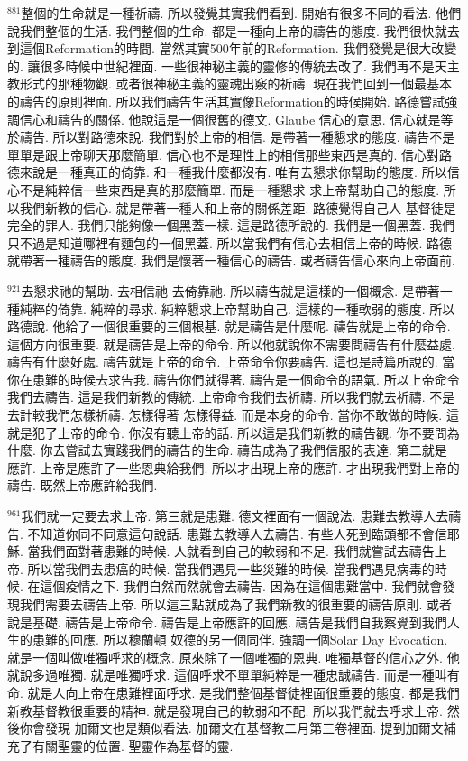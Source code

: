 \documentclass{book}
\begin{document}
$^{881}$整個的生命就是一種祈禱.
所以發覺其實我們看到.
開始有很多不同的看法.
他們說我們整個的生活.
我們整個的生命.
都是一種向上帝的禱告的態度.
我們很快就去到這個Reformation的時間.
當然其實500年前的Reformation.
我們發覺是很大改變的.
讓很多時候中世紀裡面.
一些很神秘主義的靈修的傳統去改了.
我們再不是天主教形式的那種物觀.
或者很神秘主義的靈魂出竅的祈禱.
現在我們回到一個最基本的禱告的原則裡面.
所以我們禱告生活其實像Reformation的時候開始.
路德嘗試強調信心和禱告的關係.
他說這是一個很舊的德文.
Glaube 信心的意思.
信心就是等於禱告.
所以對路德來說.
我們對於上帝的相信.
是帶著一種懇求的態度.
禱告不是單單是跟上帝聊天那麼簡單.
信心也不是理性上的相信那些東西是真的.
信心對路德來說是一種真正的倚靠.
和一種我什麼都沒有.
唯有去懇求你幫助的態度.
所以信心不是純粹信一些東西是真的那麼簡單.
而是一種懇求 求上帝幫助自己的態度.
所以我們新教的信心.
就是帶著一種人和上帝的關係差距.
路德覺得自己人 基督徒是完全的罪人.
我們只能夠像一個黑蓋一樣.
這是路德所說的.
我們是一個黑蓋.
我們只不過是知道哪裡有麵包的一個黑蓋.
所以當我們有信心去相信上帝的時候.
路德就帶著一種禱告的態度.
我們是懷著一種信心的禱告.
或者禱告信心來向上帝面前.

$^{921}$去懇求祂的幫助.
去相信祂 去倚靠祂.
所以禱告就是這樣的一個概念.
是帶著一種純粹的倚靠.
純粹的尋求.
純粹懇求上帝幫助自己.
這樣的一種軟弱的態度.
所以路德說.
他給了一個很重要的三個根基.
就是禱告是什麼呢.
禱告就是上帝的命令.
這個方向很重要.
就是禱告是上帝的命令.
所以他就說你不需要問禱告有什麼益處.
禱告有什麼好處.
禱告就是上帝的命令.
上帝命令你要禱告.
這也是詩篇所說的.
當你在患難的時候去求告我.
禱告你們就得著.
禱告是一個命令的語氣.
所以上帝命令我們去禱告.
這是我們新教的傳統.
上帝命令我們去祈禱.
所以我們就去祈禱.
不是去計較我們怎樣祈禱.
怎樣得著 怎樣得益.
而是本身的命令.
當你不敢做的時候.
這就是犯了上帝的命令.
你沒有聽上帝的話.
所以這是我們新教的禱告觀.
你不要問為什麼.
你去嘗試去實踐我們的禱告的生命.
禱告成為了我們信服的表達.
第二就是 應許.
上帝是應許了一些恩典給我們.
所以才出現上帝的應許.
才出現我們對上帝的禱告.
既然上帝應許給我們.

$^{961}$我們就一定要去求上帝.
第三就是患難.
德文裡面有一個說法.
患難去教導人去禱告.
不知道你同不同意這句說話.
患難去教導人去禱告.
有些人死到臨頭都不會信耶穌.
當我們面對著患難的時候.
人就看到自己的軟弱和不足.
我們就嘗試去禱告上帝.
所以當我們去患癌的時候.
當我們遇見一些災難的時候.
當我們遇見病毒的時候.
在這個疫情之下.
我們自然而然就會去禱告.
因為在這個患難當中.
我們就會發現我們需要去禱告上帝.
所以這三點就成為了我們新教的很重要的禱告原則.
或者說是基礎.
禱告是上帝命令.
禱告是上帝應許的回應.
禱告是我們自我察覺到我們人生的患難的回應.
所以穆蘭頓 奴德的另一個同伴.
強調一個Solar Day Evocation.
就是一個叫做唯獨呼求的概念.
原來除了一個唯獨的恩典.
唯獨基督的信心之外.
他就說多過唯獨.
就是唯獨呼求.
這個呼求不單單純粹是一種忠誠禱告.
而是一種叫有命.
就是人向上帝在患難裡面呼求.
是我們整個基督徒裡面很重要的態度.
都是我們新教基督教很重要的精神.
就是發現自己的軟弱和不配.
所以我們就去呼求上帝.
然後你會發現 加爾文也是類似看法.
加爾文在基督教二月第三卷裡面.
提到加爾文補充了有關聖靈的位置.
聖靈作為基督的靈.
\end{document}
